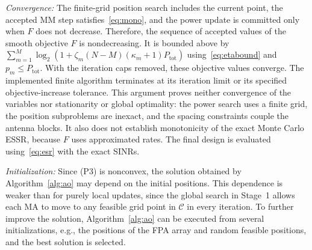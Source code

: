 \documentclass[journal]{IEEEtran}
\newcommand{\Ptot}{P_{\mathrm{tot}}}
\begin{document}
\textit{Convergence:} The finite-grid position search includes the current point, the accepted MM step satisfies~\eqref{eq:mono}, and the power update is committed only when $F$ does not decrease. Therefore, the sequence of accepted values of the smooth objective $F$ is nondecreasing. It is bounded above by $\sum_{m=1}^M\log_2(1+\zeta_m(N-M)(\kappa_m+1)\Ptot)$ using~\eqref{eq:etabound} and $p_m\le\Ptot$. With the iteration caps removed, these objective values converge. The implemented finite algorithm terminates at its iteration limit or its specified objective-increase tolerance. This argument proves neither convergence of the variables nor stationarity or global optimality: the power search uses a finite grid, the position subproblems are inexact, and the spacing constraints couple the antenna blocks. It also does not establish monotonicity of the exact Monte Carlo ESSR, because $F$ uses approximated rates. The final design is evaluated using~\eqref{eq:esr} with the exact SINRs.

\textit{Initialization:} Since (P3) is nonconvex, the solution obtained by Algorithm~\ref{alg:ao} may depend on the initial positions. This dependence is weaker than for purely local updates, since the global search in Stage~1 allows each MA to move to any feasible grid point in $\mathcal C$ in every iteration. To further improve the solution, Algorithm~\ref{alg:ao} can be executed from several initializations, e.g., the positions of the FPA array and random feasible positions, and the best solution is selected.
\end{document}
